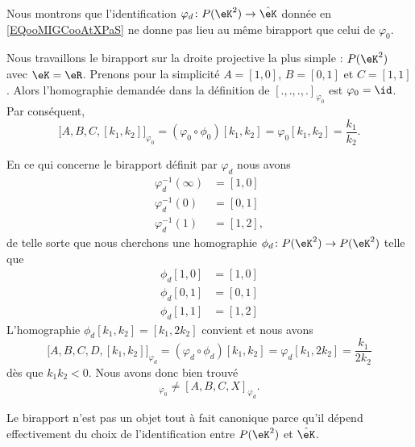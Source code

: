 \begin{example}        \label{EXooYCOYooWFSfUv}
	Nous montrons que l'identification \( \varphi_d\colon P(\eK^2)\to \hat\eK\) donnée en \eqref{EQooMIGCooAtXPaS} ne donne pas lieu au même birapport que celui de \( \varphi_0\).

	Nous travaillons le birapport sur la droite projective la plus simple : \( P(\eK^2)\) avec \( \eK=\eR\). Prenons pour la simplicité \( A=[1,0]\), \( B=[0,1]\) et \( C=[1,1]\). Alors l'homographie demandée dans la définition de \( [.,.,.,.]_{\varphi_0}\) est \( \varphi_0=\id\). Par conséquent,
	\begin{equation}
		\big[ A,B,C,[k_1,k_2] \big]_{\varphi_0}=(\varphi_0\circ\phi_0)[k_1,k_2]=\varphi_0[k_1,k_2]=\frac{ k_1 }{ k_2 }.
	\end{equation}

	En ce qui concerne le birapport définit par \( \varphi_d\) nous avons
	\begin{subequations}
		\begin{align}
			\varphi_d^{-1}(\infty) & =[1,0]  \\
			\varphi_d^{-1}(0)      & =[0,1]  \\
			\varphi_d^{-1}(1)      & =[1,2],
		\end{align}
	\end{subequations}
	de telle sorte que nous cherchons une homographie \( \phi_d\colon P(\eK^2)\to P(\eK^2)\) telle que
	\begin{subequations}
		\begin{align}
			\phi_d[1,0] & =[1,0] \\
			\phi_d[0,1] & =[0,1] \\
			\phi_d[1,1] & =[1,2]
		\end{align}
	\end{subequations}
	L'homographie \( \phi_d[k_1,k_2]=[k_1,2k_2]\) convient et nous avons
	\begin{equation}
		\big[ A,B,C,D,[k_1,k_2] \big]_{\varphi_d}=(\varphi_d\circ\phi_d)[k_1,k_2]=\varphi_d[k_1,2k_2]=\frac{ k_1 }{ 2k_2 }
	\end{equation}
	dès que \( k_1k_2<0\). Nous avons donc bien trouvé
	\begin{equation}
		[A,B,C,X]_{\varphi_0}\neq [A,B,C,X]_{\varphi_d}.
	\end{equation}
\end{example}

Le birapport n'est pas un objet tout à fait canonique parce qu'il dépend effectivement du choix de l'identification entre \( P(\eK^2)\) et \( \hat\eK\).

